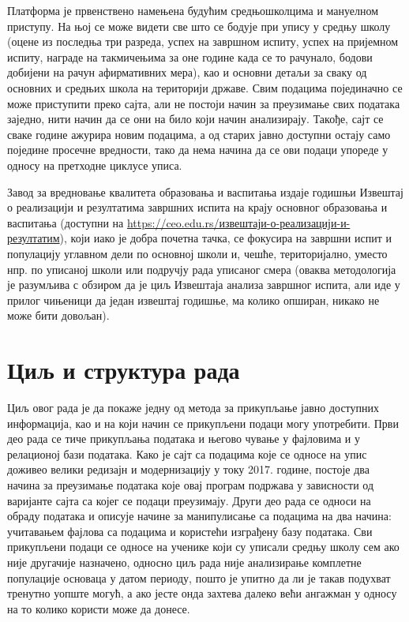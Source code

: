 Платформа је првенствено намењена будућим средњошколцима и мануелном приступу. На њој се може видети све што се бодује при упису у средњу школу (оцене из последња три разреда, успех на завршном испиту, успех на пријемном испиту, награде на такмичењима за оне године када се то рачунало, бодови добијени на рачун афирмативних мера), као и основни детаљи за сваку од основних и средњих школа на територији државе. Свим подацима појединачно се може приступити преко сајта, али не постоји начин за преузимање свих података заједно, нити начин да се они на било који начин анализирају. Такође, сајт се сваке године ажурира новим подацима, а од старих јавно доступни остају само поједине просечне вредности, тако да нема начина да се ови подаци упореде у односу на претходне циклусе уписа.

Завод за вредновање квалитета образовања и васпитања издаје годишњи Извештај о реализацији и резултатима завршних испита на крају основног образовања и васпитања (доступни на \href{https://ceo.edu.rs/\%D0\%B8\%D0\%B7\%D0\%B2\%D0\%B5\%D1\%88\%D1\%82\%D0\%B0\%D1\%98\%D0\%B8-\%D0\%BE-\%D1\%80\%D0\%B5\%D0\%B0\%D0\%BB\%D0\%B8\%D0\%B7\%D0\%B0\%D1\%86\%D0\%B8\%D1\%98\%D0\%B8-\%D0\%B8-\%D1\%80\%D0\%B5\%D0\%B7\%D1\%83\%D0\%BB\%D1\%82\%D0\%B0\%D1\%82\%D0\%B8\%D0\%BC/}{https://ceo.edu.rs/извештаји-о-реализацији-и-резултатим}), који иако је добра почетна тачка, се фокусира на завршни испит и популацију углавном дели по основној школи и, чешће, територијално, уместо нпр. по уписаној школи или подручју рада уписаног смера (оваква методологија је разумљива с обзиром да је циљ Извештаја анализа завршног испита, али иде у прилог чињеници да један извештај годишње, ма колико опширан, никако не може бити довољан).

\section{Циљ и структура рада}

Циљ овог рада је да покаже једну од метода за прикупљање јавно доступних информација, као и на који начин се прикупљени подаци могу употребити. Први део рада се тиче прикупљања података и његово чување у фајловима и у релационој бази података. Како је сајт са подацима које се односе на упис доживео велики редизајн и модернизацију у току 2017. године, постоје два начина за преузимање података које овај програм подржава у зависности од варијанте сајта са којег се подаци преузимају. Други део рада се односи на обраду података и описује начине за манипулисање са подацима на два начина: учитавањем фајлова са подацима и користећи изграђену базу података. Сви прикупљени подаци се односе на ученике који су уписали средњу школу сем ако није другачије назначено, односно циљ рада није анализирање комплетне популације основаца у датом периоду, пошто је упитно да ли је такав подухват тренутно уопште могућ, а ако јесте онда захтева далеко већи ангажман у односу на то колико користи може да донесе.
